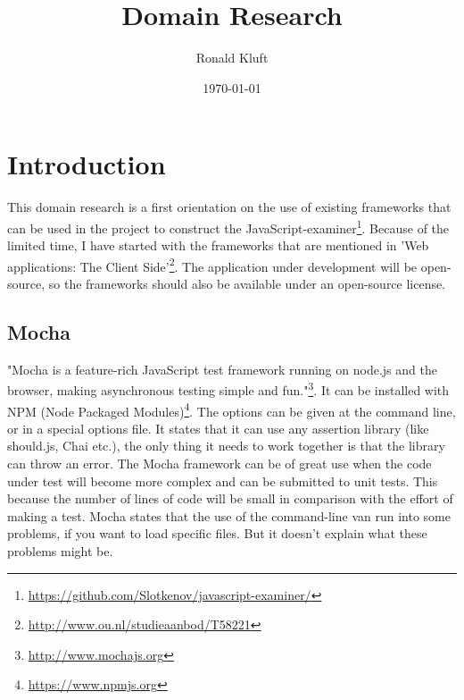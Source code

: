 \documentclass{article}
\begin{document}
\title{Domain Research}
\author{Ronald Kluft}
\date{\today}
\maketitle


\section{Introduction}
This domain research is a first orientation on the use of existing frameworks that can be used in the 
project to construct the JavaScript-examiner\footnote{\url{https://github.com/Slotkenov/javascript-examiner/}}.
Because of the limited time, I have started with the frameworks that are mentioned in 
'Web applications: The Client Side'\footnote{\url{http://www.ou.nl/studieaanbod/T58221}}.
The application under development will be open-source, so the frameworks should also be available
under an open-source license.

\subsection{Mocha}
"Mocha is a feature-rich JavaScript test framework running on node.js and the 
browser, making asynchronous testing simple and fun."\footnote{\url{http://www.mochajs.org}}.
It can be installed with NPM (Node Packaged Modules)\footnote{\url{https://www.npmjs.org}}.
The options can be given at the command line, or in a special options file.
It states that it can use any assertion library (like should.js, Chai etc.), 
the only thing it needs to work together is that the library can throw an error.
The Mocha framework can be of great use when the code under test will become more complex and can be submitted to unit tests.
This because the number of lines of code will be small in comparison with the effort of making a test.
Mocha states that the use of the command-line van run into some problems, if you want to load specific files. 
But it doesn't explain what these problems might be.
\end{document}
